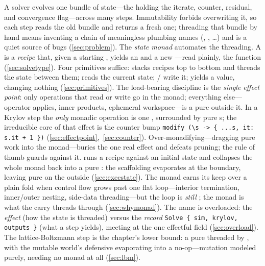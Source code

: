 \summarysection
A solver evolves one bundle of state---the  holding the iterate,
counter, residual, and convergence flag---across many steps. Immutability forbids
overwriting it, so each step reads the old bundle and returns a fresh one; threading
that bundle by hand means inventing a chain of meaningless plumbing names (,
, \dots) and is a quiet source of bugs (\cref{sec:problem}). The
\emph{state monad} automates the threading. A  is a \emph{recipe} that, given a starting , yields an
 and a new ---read plainly, the function
 (\cref{sec:solvetype}). Four primitives suffice:
 stacks recipes top to bottom and threads the state between them; 
reads the current state;  /  write it; 
yields a value, changing nothing (\cref{sec:primitives}). The load-bearing discipline
is the \emph{single effect point}: only operations that read or write 
go in the monad; everything else---operator applies, inner products, ephemeral
workspace---is a pure  outside it. In a Krylov step the \emph{only} monadic
operation is one , surrounded by pure s; the irreducible core of
that effect is the counter bump
\lstinline[style=l4style]|modify (\s -> { ...s, it: s.it + 1 })|
(\cref{sec:effectpoint},~\cref{sec:counter}). Over-monadifying---dragging pure work
into the monad---buries the one real effect and defeats pruning; the rule of thumb
guards against it.  runs a recipe against an initial state and collapses
the whole monad back into a pure : the scaffolding
evaporates at the boundary, leaving  pure on the outside
(\cref{sec:execstate}). The monad earns its keep over a plain fold when control flow
grows past one flat loop---interior termination, inner/outer nesting, side-data
threading---but the loop is \emph{still} ; the monad is what the
carry threads through (\cref{sec:whymonad}). The name  is overloaded: the
\emph{effect}  (how the state is threaded) versus the
\emph{record} \lstinline[style=l4style]|Solve { sim, krylov, outputs }| (what a step
yields), meeting at the one effectful field  (\cref{sec:overload}). The
lattice-Boltzmann step is the chapter's lower bound: a pure
 threaded by , with the
mutable world's defensive  evaporating into a no-op---mutation modeled
purely, needing no monad at all (\cref{sec:lbm}).

